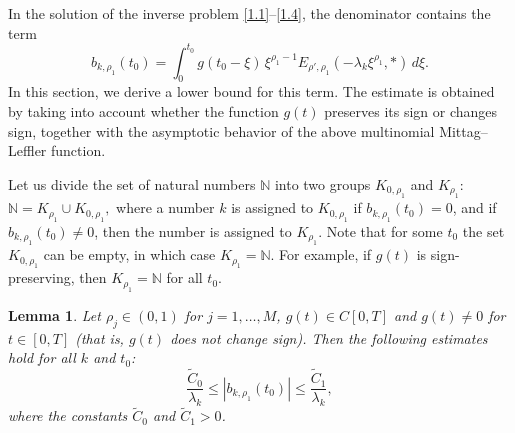 \documentclass[12pt, reqno]{amsart}
\newtheorem{lemma}[theorem]{Lemma}
\theoremstyle{definition}
\theoremstyle{remark}
\numberwithin{equation}{section}
\begin{document}
In the solution of the inverse problem \eqref{1.1}--\eqref{1.4}, the denominator contains the term
\[
b_{k,\rho_1}(t_0)
=
\int_0^{t_0}
g(t_0 - \xi)\,
\xi^{\rho_1-1}
E_{\rho',\rho_1}(-\lambda_k \xi^{\rho_1},\ast)
\, d\xi.
\]
In this section, we derive a lower bound for this term. The estimate is obtained by taking into account whether the function $g(t)$ preserves its sign or changes sign, together with the asymptotic behavior of the above multinomial Mittag--Leffler function.

\medskip

Let us divide the set of natural numbers $\mathbb{N}$ into two groups $K_{0,\rho_1}$ and $K_{\rho_1}$:
$\mathbb{N} = K_{\rho_1} \cup K_{0,\rho_1},$
where a number $k$ is assigned to $K_{0,\rho_1}$ if $b_{k,\rho_1}(t_0) = 0$, and if $b_{k,\rho_1}(t_0) \neq 0$, then the number is assigned to $K_{\rho_1}$.  
Note that for some $t_0$ the set $K_{0,\rho_1}$ can be empty, in which case $K_{\rho_1} = \mathbb{N}$. For example, if $g(t)$ is sign-preserving, then $ K_{\rho_1} = \mathbb{N}
$ for all $ t_0.$
\medskip
\begin{lemma}\label{lem5}
Let $\rho_j \in (0,1)$ for $j=1,\dots,M$, $g(t) \in C[0,T]$ and $g(t)\neq 0$ for $t\in[0,T]$ (that is, $g(t)$ does not change sign). Then the following estimates hold for all $k$ and $t_0$:
\begin{equation}\label{4.1}
 \frac{\widetilde C_0}{\lambda_k} \le |b_{k,\rho_1}(t_0)| \le  \frac{\widetilde C_1}{\lambda_k},
\end{equation}
where the constants $\widetilde C_0$ and $\widetilde C_1 > 0$.
\end{lemma}
\end{document}
